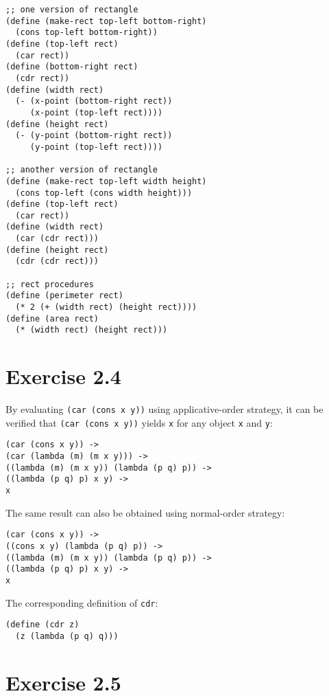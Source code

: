 \documentclass[../main.tex]{subfiles}
\begin{document}
\begin{lstlisting}
;; one version of rectangle
(define (make-rect top-left bottom-right)
  (cons top-left bottom-right))
(define (top-left rect)
  (car rect))
(define (bottom-right rect)
  (cdr rect))
(define (width rect)
  (- (x-point (bottom-right rect))
     (x-point (top-left rect))))
(define (height rect)
  (- (y-point (bottom-right rect))
     (y-point (top-left rect))))

;; another version of rectangle
(define (make-rect top-left width height)
  (cons top-left (cons width height)))
(define (top-left rect)
  (car rect))
(define (width rect)
  (car (cdr rect)))
(define (height rect)
  (cdr (cdr rect)))

;; rect procedures
(define (perimeter rect)
  (* 2 (+ (width rect) (height rect))))
(define (area rect)
  (* (width rect) (height rect)))
\end{lstlisting}

\section{Exercise 2.4}

By evaluating \lstinline{(car (cons x y))} using
 applicative-order strategy, it can be verified
 that \lstinline{(car (cons x y))} yields
 \lstinline{x} for any object \lstinline{x} and
 \lstinline{y}:

\begin{lstlisting}
(car (cons x y)) ->
(car (lambda (m) (m x y))) ->
((lambda (m) (m x y)) (lambda (p q) p)) ->
((lambda (p q) p) x y) ->
x
\end{lstlisting}

The same result can also be obtained using
 normal-order strategy:

\begin{lstlisting}
(car (cons x y)) ->
((cons x y) (lambda (p q) p)) ->
((lambda (m) (m x y)) (lambda (p q) p)) ->
((lambda (p q) p) x y) ->
x
\end{lstlisting}

The corresponding definition of \lstinline{cdr}:

\begin{lstlisting}
(define (cdr z)
  (z (lambda (p q) q)))
\end{lstlisting}

\section{Exercise 2.5}
\end{document}

